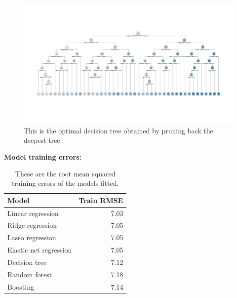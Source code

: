 \documentclass[
]{article}
\begin{document}
\begin{figure}[H]

{\centering \includegraphics[width=1\linewidth]{../results/optimal-tree-plot} 

}

\caption{This is the optimal decision tree obtained by pruning back the deepest tree.}\label{fig:optimal-tree-plot}
\end{figure}

\textbf{Model training errors:}

\begin{table}[H]

\caption{\label{tab:train-model-errors}These are the root mean squared training 
        errors of the models fitted.}
\centering
\begin{tabular}[t]{lr}
\toprule
Model & Train RMSE\\
\midrule
Linear regression & 7.03\\
Ridge regression & 7.05\\
Lasso regression & 7.05\\
Elastic net regression & 7.05\\
Decision tree & 7.12\\
\addlinespace
Random forest & 7.18\\
Boosting & 7.14\\
\bottomrule
\end{tabular}
\end{table}
\end{document}
